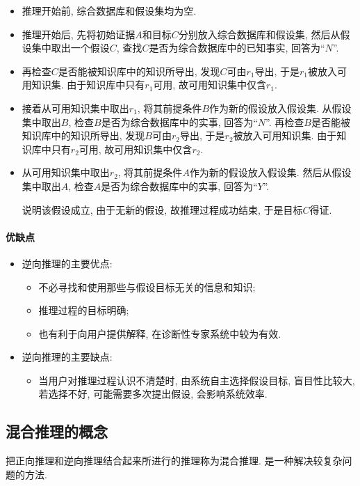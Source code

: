 \begin{itemize}
\item 推理开始前, 综合数据库和假设集均为空.
\item 推理开始后, 先将初始证据$A$和目标$C$分别放入综合数据库和假设集, 然后从假设集中取出一个假设$C$, 查找$C$是否为综合数据库中的已知事实, 回答为“$N$”.
\item 再检查$C$是否能被知识库中的知识所导出, 发现$C$可由$r_1$导出, 于是$r_1$被放入可用知识集. 由于知识库中只有$r_1$可用, 故可用知识集中仅含$r_1$.
\item 接着从可用知识集中取出$r_1$, 将其前提条件$B$作为新的假设放入假设集. 从假设集中取出$B$, 检查$B$是否为综合数据库中的实事, 回答为“$N$”. 再检查$B$是否能被知识库中的知识所导出, 发现$B$可由$r_2$导出, 于是$r_2$被放入可用知识集. 由于知识库中只有$r_2$可用, 故可用知识集中仅含$r_2$.
\item 从可用知识集中取出$r_2$, 将其前提条件$A$作为新的假设放入假设集. 然后从假设集中取出$A$, 检查$A$是否为综合数据库中的实事, 回答为“$Y$”.

    说明该假设成立, 由于无新的假设, 故推理过程成功结束, 于是目标$C$得证.
\end{itemize}
\paragraph{优缺点}
\begin{itemize}
\item 逆向推理的主要优点:
\begin{itemize}
\item 不必寻找和使用那些与假设目标无关的信息和知识;
\item 推理过程的目标明确;
\item 也有利于向用户提供解释, 在诊断性专家系统中较为有效.
\end{itemize}
\end{itemize}

\begin{itemize}
\item 逆向推理的主要缺点:
\begin{itemize}
\item 当用户对推理过程认识不清楚时, 由系统自主选择假设目标, 盲目性比较大, 若选择不好, 可能需要多次提出假设, 会影响系统效率.
\end{itemize}
\end{itemize}
\subsection{混合推理的概念}
把正向推理和逆向推理结合起来所进行的推理称为混合推理. 是一种解决较复杂问题的方法.
